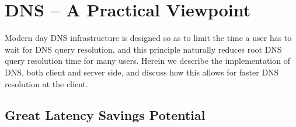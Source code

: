 \documentclass[sigconf,nonacm,10pt]{acmart}
\begin{document}
\section{DNS -- A Practical
Viewpoint}\label{dns-a-practical-viewpoint-1}

\label{sec:dns_practical_viewpoint} Modern day DNS infrastructure is
designed so as to limit the time a user has to wait for DNS query
resolution, and this principle naturally reduces root DNS query
resolution time for many users. Herein we describe the implementation of
DNS, both client and server side, and discuss how this allows for faster
DNS resolution at the client.

\subsection{Great Latency Savings
Potential}\label{great-latency-savings-potential-1}
\end{document}
